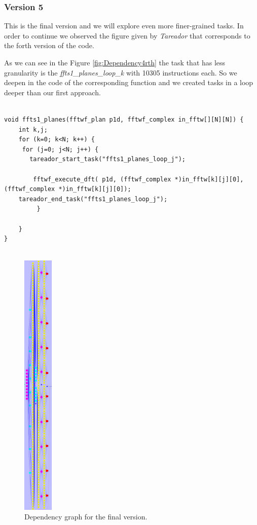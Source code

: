 \documentclass[12]{article}
\begin{document}
\subsubsection{Version 5}
This is the final version and we will explore even more finer-grained tasks. In order to continue we observed the figure given by \textit{Tareador} that corresponds to the forth version of the code. 

As we can see in the Figure \ref{fig:Dependency4rth} the task  that has less granularity is the \textit{ffts1\_planes\_loop\_k} with 10305 instructions each. So we deepen in the code of the corresponding function and we created tasks in a loop deeper than our first approach. 
\begin{lstlisting}

void ffts1_planes(fftwf_plan p1d, fftwf_complex in_fftw[][N][N]) {
    int k,j;
    for (k=0; k<N; k++) {
     for (j=0; j<N; j++) {
       tareador_start_task("ffts1_planes_loop_j");

        fftwf_execute_dft( p1d, (fftwf_complex *)in_fftw[k][j][0], (fftwf_complex *)in_fftw[k][j][0]);
    tareador_end_task("ffts1_planes_loop_j");
         }

    }
}


\end{lstlisting}
\bigskip

\begin{figure}[H]
\centering  \includegraphics[width=\linewidth , height=13cm, width=4cm  ]{images/dependency_graph5.png}
  \caption{Dependency graph for the final version.}
  \label{fig:Dependency5}
\end{figure}
\end{document}
